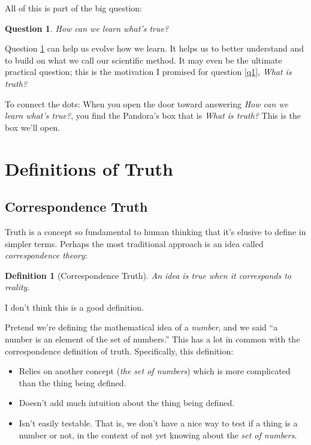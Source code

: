\documentclass[11pt, oneside]{article}   	%
\newtheorem{question}{Question}
\newtheorem{defn}{Definition}
\begin{document}
All of this is part of the big question:

\begin{question}\label{q2}
    How can we learn what's true?
\end{question}

Question \ref{q2} can help us evolve how we learn.
It helps us to better understand and to build on what we call our
scientific method.
It may even
be the ultimate practical question; this is the motivation I promised for
question \ref{q1}, {\em What is truth?}

To connect the dots: When you open the door toward answering {\em How can we
learn what's true?}, you find the
Pandora's box that is {\em What is truth?} This is the box we'll open.

\section{Definitions of Truth}\label{s2}

\subsection{Correspondence Truth}

Truth is a concept so fundamental to human thinking that it's elusive to define
in simpler terms.
Perhaps the most traditional approach is an idea called
{\em correspondence theory}\/:

\begin{defn}[Correspondence Truth]\label{d1}
    An idea is true when it corresponds to reality.
\end{defn}

I don't think this is a good definition.

Pretend we're defining the mathematical idea of a {\em number}, and we said
``a number is an element of the set of numbers.'' This 
has a lot in common with the correspondence definition of truth.
Specifically, this definition:
\begin{itemize}
    \item Relies on another concept ({\em the set of numbers})
        which is more complicated than the thing
        being defined. 
    \item Doesn't add much intuition about the thing being defined.
    \item Isn't easily testable. That is, we don't have a nice
        way to test if a thing is a number or not, in the context of not yet
        knowing about the {\em set of numbers}.
\end{itemize}
\end{document}
